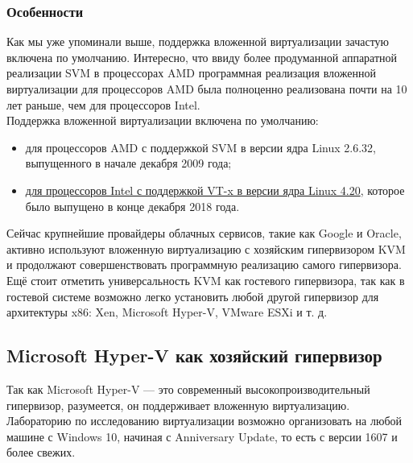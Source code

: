\documentclass[14pt, a4paper]{article}
\begin{document}
\subsubsection*{Особенности}

Как мы уже упоминали выше, поддержка вложенной виртуализации зачастую включена по
умолчанию. Интересно, что ввиду более продуманной аппаратной реализации SVM в процессорах
AMD программная реализация вложенной виртуализации для процессоров AMD была полноценно
реализована почти на 10 лет раньше, чем для процессоров Intel.\\

Поддержка вложенной виртуализации включена по умолчанию:
\begin{itemize}
    \item для процессоров AMD с поддержкой SVM в версии ядра Linux 2.6.32, выпущенного в начале
    декабря 2009 года;
    \item \href{https://git.kernel.org/pub/scm/linux/kernel/git/torvalds/linux.git/commit/?id=1e58e5e59148916fa43444a406335a990783fb78}{для процессоров Intel с поддержкой VT-x в версии ядра Linux 4.20}, которое было выпущено в
    конце декабря 2018 года.
\end{itemize}

Сейчас крупнейшие провайдеры облачных сервисов, такие как Google и Oracle, активно используют
вложенную виртуализацию с хозяйским гипервизором KVM и продолжают совершенствовать
программную реализацию самого гипервизора.\\

Ещё стоит отметить универсальность KVM как гостевого гипервизора, так как в гостевой системе
возможно легко установить любой другой гипервизор для архитектуры x86: Xen, Microsoft Hyper-V,
VMware ESXi и т. д.\\

\newpage

\subsection*{Microsoft Hyper-V как хозяйский гипервизор}

\begin{figure}[h]
    \centering
    \label{framework} 
\end{figure}

Так как Microsoft Hyper-V — это современный высокопроизводительный гипервизор, разумеется, он
поддерживает вложенную виртуализацию. Лабораторию по исследованию виртуализации возможно
организовать на любой машине с Windows 10, начиная с Anniversary Update, то есть с версии 1607 и
более свежих.
\end{document}
